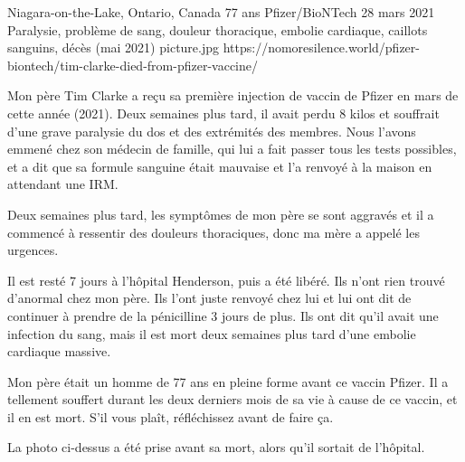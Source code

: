{Niagara-on-the-Lake, Ontario, Canada}
{77 ans}
{Pfizer/BioNTech}
{28 mars 2021}
{Paralysie, problème de sang, douleur thoracique, embolie cardiaque, caillots sanguins, décès (mai 2021)}
{picture.jpg}
{https://nomoresilence.world/pfizer-biontech/tim-clarke-died-from-pfizer-vaccine/}
{

Mon père Tim Clarke a reçu sa première injection de vaccin de Pfizer en mars de
cette année (2021). Deux semaines plus tard, il avait perdu 8 kilos et souffrait
d'une grave paralysie du dos et des extrémités des membres. Nous l'avons emmené
chez son médecin de famille, qui lui a fait passer tous les tests possibles, et
a dit que sa formule sanguine était mauvaise et l'a renvoyé à la maison en
attendant une IRM.

Deux semaines plus tard, les symptômes de mon père se sont aggravés et il a
commencé à ressentir des douleurs thoraciques, donc ma mère a appelé les
urgences.

Il est resté 7 jours à l'hôpital Henderson, puis a été libéré. Ils n'ont rien
trouvé d'anormal chez mon père. Ils l'ont juste renvoyé chez lui et lui ont dit
de continuer à prendre de la pénicilline 3 jours de plus. Ils ont dit qu'il
avait une infection du sang, mais il est mort deux semaines plus tard d'une
embolie cardiaque massive.

Mon père était un homme de 77 ans en pleine forme avant ce vaccin Pfizer. Il a
tellement souffert durant les deux derniers mois de sa vie à cause de ce vaccin,
et il en est mort. S'il vous plaît, réfléchissez avant de faire ça.

La photo ci-dessus a été prise avant sa mort, alors qu'il sortait de l'hôpital.

}

